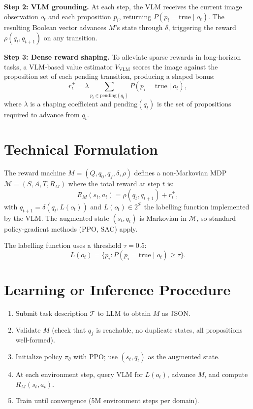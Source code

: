 \documentclass[10pt,twocolumn]{article}
\begin{document}
\textbf{Step 2: VLM grounding.}
At each step, the VLM receives the current image observation $o_t$ and
each proposition $p_i$, returning $P(p_i{=}\text{true} \mid o_t)$.
The resulting Boolean vector advances $M$'s state through $\delta$,
triggering the reward $\rho(q_t, q_{t+1})$ on any transition.

\textbf{Step 3: Dense reward shaping.}
To alleviate sparse rewards in long-horizon tasks, a VLM-based value
estimator $V_{\text{VLM}}$ scores the image against the proposition
set of each pending transition, producing a shaped bonus:
\[
  r^+_t = \lambda \sum_{p_i \in \text{pending}(q_t)}
    P(p_i{=}\text{true} \mid o_t),
\]
where $\lambda$ is a shaping coefficient and $\text{pending}(q_t)$
is the set of propositions required to advance from $q_t$.

\section{Technical Formulation}

The reward machine $M = (Q, q_0, q_f, \delta, \rho)$ defines a
non-Markovian MDP $\mathcal{M} = (S, A, T, R_M)$ where the total
reward at step $t$ is:
\[
  R_M(s_t, a_t) = \rho(q_t, q_{t+1}) + r^+_t,
\]
with $q_{t+1} = \delta(q_t, L(o_t))$ and
$L(o_t) \in 2^\mathcal{P}$ the labelling function implemented by the
VLM. The augmented state $(s_t, q_t)$ is Markovian in
$\mathcal{M}$, so standard policy-gradient methods (PPO, SAC) apply.

The labelling function uses a threshold $\tau = 0.5$:
\[
  L(o_t) = \{p_i : P(p_i{=}\text{true} \mid o_t) \ge \tau\}.
\]

\section{Learning or Inference Procedure}

\begin{enumerate}[itemsep=2pt,parsep=0pt]
  \item Submit task description $\mathcal{T}$ to LLM to obtain $M$
    as JSON.
  \item Validate $M$ (check that $q_f$ is reachable, no duplicate
    states, all propositions well-formed).
  \item Initialize policy $\pi_\theta$ with PPO; use
    $(s_t, q_t)$ as the augmented state.
  \item At each environment step, query VLM for $L(o_t)$, advance $M$,
    and compute $R_M(s_t, a_t)$.
  \item Train until convergence (5M environment steps per domain).
\end{enumerate}
\end{document}
